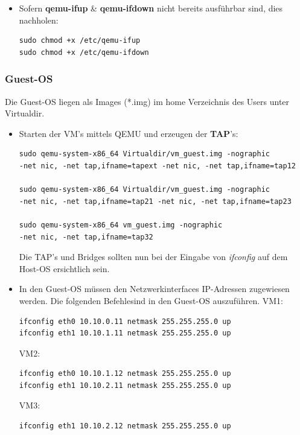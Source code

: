 \documentclass[a4,12pt]{scrartcl}
\begin{document}
\begin{itemize}
\item Sofern \textbf{qemu-ifup} \& \textbf{qemu-ifdown} nicht bereits ausführbar sind, dies nachholen:
\begin{lstlisting}
sudo chmod +x /etc/qemu-ifup
sudo chmod +x /etc/qemu-ifdown
\end{lstlisting}
\end{itemize}

\subsubsection{Guest-OS}
Die Guest-OS liegen als Images (*.img) im home Verzeichnis des Users unter Virtualdir. 
\begin{itemize}
\item Starten der VM's mittels QEMU und erzeugen der \textbf{TAP}'s:
\begin{lstlisting}
sudo qemu-system-x86_64 Virtualdir/vm_guest.img -nographic 
-net nic, -net tap,ifname=tapext -net nic, -net tap,ifname=tap12

sudo qemu-system-x86_64 Virtualdir/vm_guest.img -nographic
-net nic, -net tap,ifname=tap21 -net nic, -net tap,ifname=tap23

sudo qemu-system-x86_64 vm_guest.img -nographic
-net nic, -net tap,ifname=tap32
\end{lstlisting}
Die TAP's und Bridges sollten nun bei der Eingabe von \textit{ifconfig} auf dem Host-OS ersichtlich sein.

\item In den Guest-OS müssen den Netzwerkinterfaces IP-Adressen zugewiesen werden. Die folgenden Befehlesind in den Guest-OS auszuführen.
\newline
VM1:
\begin{lstlisting}
ifconfig eth0 10.10.0.11 netmask 255.255.255.0 up
ifconfig eth1 10.10.1.11 netmask 255.255.255.0 up
\end{lstlisting}
VM2:
\begin{lstlisting}
ifconfig eth0 10.10.1.12 netmask 255.255.255.0 up
ifconfig eth1 10.10.2.11 netmask 255.255.255.0 up
\end{lstlisting}
VM3:
\begin{lstlisting}
ifconfig eth1 10.10.2.12 netmask 255.255.255.0 up
\end{lstlisting}
\end{itemize}
\end{document}
